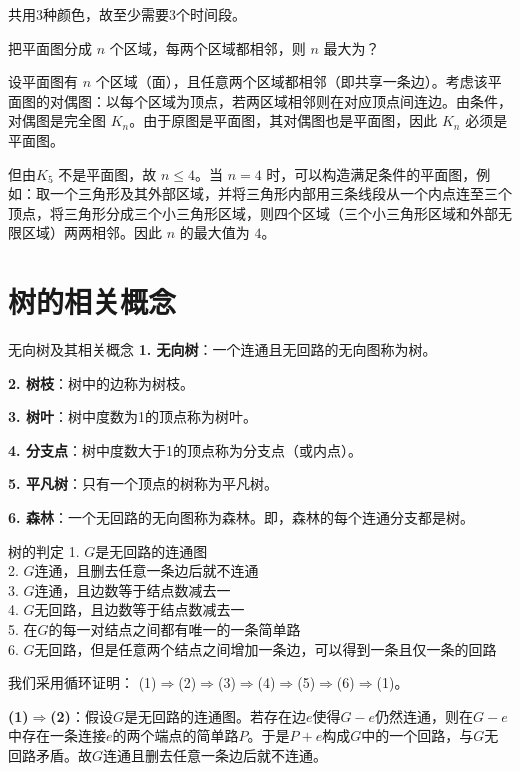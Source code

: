 共用3种颜色，故至少需要3个时间段。
\begin{example}{}{}
把平面图分成 $n$ 个区域，每两个区域都相邻，则 $n$ 最大为？
\end{example}
设平面图有 $n$ 个区域（面），且任意两个区域都相邻（即共享一条边）。考虑该平面图的对偶图：以每个区域为顶点，若两区域相邻则在对应顶点间连边。由条件，对偶图是完全图 $K_n$。由于原图是平面图，其对偶图也是平面图，因此 $K_n$ 必须是平面图。

但由$K_5$ 不是平面图，故 $n \le 4$。当 $n=4$ 时，可以构造满足条件的平面图，例如：取一个三角形及其外部区域，并将三角形内部用三条线段从一个内点连至三个顶点，将三角形分成三个小三角形区域，则四个区域（三个小三角形区域和外部无限区域）两两相邻。因此 $n$ 的最大值为 $4$。

\newpage
\section{树的相关概念}
\begin{definition}{无向树及其相关概念}{}
    \textbf{1. 无向树}：一个连通且无回路的无向图称为树。

    \textbf{2. 树枝}：树中的边称为树枝。

    \textbf{3. 树叶}：树中度数为1的顶点称为树叶。

    \textbf{4. 分支点}：树中度数大于1的顶点称为分支点（或内点）。

    \textbf{5. 平凡树}：只有一个顶点的树称为平凡树。

    \textbf{6. 森林}：一个无回路的无向图称为森林。即，森林的每个连通分支都是树。
\end{definition}
\begin{theorem}{树的判定}{}
    1. $G$是无回路的连通图\\
    2. $G$连通，且删去任意一条边后就不连通\\
    3. $G$连通，且边数等于结点数减去一\\
    4. $G$无回路，且边数等于结点数减去一\\
    5. 在$G$的每一对结点之间都有唯一的一条简单路\\
    6. $G$无回路，但是任意两个结点之间增加一条边，可以得到一条且仅一条的回路
\end{theorem}
我们采用循环证明：
(1)$\Rightarrow$(2)$\Rightarrow$(3)$\Rightarrow$(4)$\Rightarrow$(5)$\Rightarrow$(6)$\Rightarrow$(1)。

\textbf{(1)$\Rightarrow$(2)}：假设$G$是无回路的连通图。若存在边$e$使得$G-e$仍然连通，则在$G-e$中存在一条连接$e$的两个端点的简单路$P$。于是$P+e$构成$G$中的一个回路，与$G$无回路矛盾。故$G$连通且删去任意一条边后就不连通。

